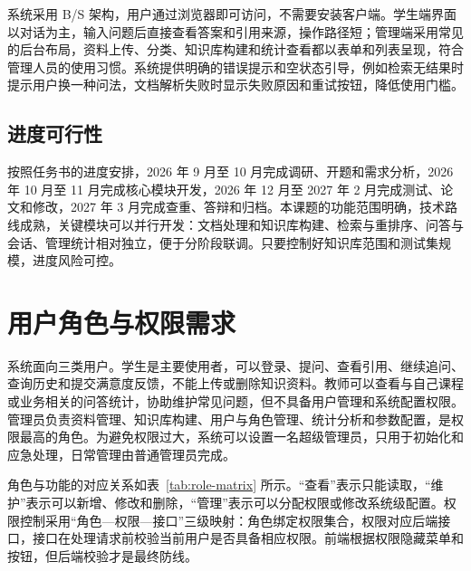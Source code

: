 系统采用 B/S 架构，用户通过浏览器即可访问，不需要安装客户端。学生端界面以对话为主，输入问题后直接查看答案和引用来源，操作路径短；管理端采用常见的后台布局，资料上传、分类、知识库构建和统计查看都以表单和列表呈现，符合管理人员的使用习惯。系统提供明确的错误提示和空状态引导，例如检索无结果时提示用户换一种问法，文档解析失败时显示失败原因和重试按钮，降低使用门槛。

\subsection{进度可行性}

按照任务书的进度安排，2026 年 9 月至 10 月完成调研、开题和需求分析，2026 年 10 月至 11 月完成核心模块开发，2026 年 12 月至 2027 年 2 月完成测试、论文和修改，2027 年 3 月完成查重、答辩和归档。本课题的功能范围明确，技术路线成熟，关键模块可以并行开发：文档处理和知识库构建、检索与重排序、问答与会话、管理统计相对独立，便于分阶段联调。只要控制好知识库范围和测试集规模，进度风险可控。

\section{用户角色与权限需求}
\label{sec:roles}

系统面向三类用户。学生是主要使用者，可以登录、提问、查看引用、继续追问、查询历史和提交满意度反馈，不能上传或删除知识资料。教师可以查看与自己课程或业务相关的问答统计，协助维护常见问题，但不具备用户管理和系统配置权限。管理员负责资料管理、知识库构建、用户与角色管理、统计分析和参数配置，是权限最高的角色。为避免权限过大，系统可以设置一名超级管理员，只用于初始化和应急处理，日常管理由普通管理员完成。

角色与功能的对应关系如表~\ref{tab:role-matrix} 所示。“查看”表示只能读取，“维护”表示可以新增、修改和删除，“管理”表示可以分配权限或修改系统级配置。权限控制采用“角色—权限—接口”三级映射：角色绑定权限集合，权限对应后端接口，接口在处理请求前校验当前用户是否具备相应权限。前端根据权限隐藏菜单和按钮，但后端校验才是最终防线。

